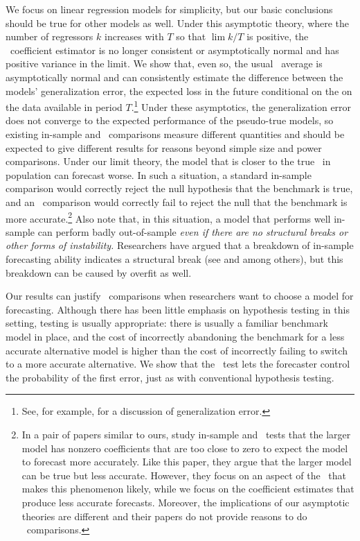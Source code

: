\documentclass[11pt]{article}
\begin{document}
We focus on linear regression models for simplicity, but our basic
conclusions should be true for other models as well.  Under this
asymptotic theory, where the number of regressors $k$ increases with $T$
so that $\lim k/T$ is positive,
the \ols\ coefficient estimator is no longer
consistent or asymptotically normal \citep{Hub:73} and has positive
variance in the limit.  We show that, even so, the usual \oos\ average
is asymptotically normal and can consistently estimate the difference
between the models' generalization error, the expected loss in the
future conditional on the on the data available in period
$T$.\footnote{See, for example, \citet{HTF:08} for a discussion of
  generalization error.}  Under these asymptotics, the generalization
error does not converge to the expected performance of the pseudo-true
models, so existing in-sample and \oos\ comparisons measure different
quantities and should be expected to give different results for
reasons beyond simple size and power comparisons.  Under our limit theory,
the model that is closer to the true \dgp\ in population can forecast
worse.  In such a situation, a standard in-sample comparison would
correctly reject the null hypothesis that the benchmark is true, and
an \oos\ comparison would correctly fail to reject the null that the
benchmark is more accurate.\footnote{In a pair of papers similar to
  ours, \citet{ClM:12,ClM:12b} study in-sample and \oos\ tests that
  the larger model has nonzero coefficients that are too close to zero
  to expect the model to forecast more accurately.  Like this paper,
  they argue that the larger model can be true but less accurate.
  However, they focus on an aspect of the \dgp\ that makes this
  phenomenon likely, while we focus on the coefficient estimates that
  produce less accurate forecasts.  Moreover, the implications of our
  asymptotic theories are different and their papers do not provide
  reasons to do \oos\ comparisons.}
Also note that, in this situation, a model that performs well
in-sample can perform badly out-of-sample \emph{even if there are no
structural breaks or other forms of instability.}  Researchers
have argued that a breakdown of in-sample forecasting ability
indicates a structural break (see \citealp{BoH:99} and
\citealp{StW:03} among others), but this breakdown can be caused by overfit as
well.

Our results can justify \oos\ comparisons when researchers want to
choose a model for forecasting.  Although there has been little
emphasis on hypothesis testing in this setting, testing is usually
appropriate: there is usually a familiar benchmark model in place, and
the cost of incorrectly abandoning the benchmark for a less accurate
alternative model is higher than the cost of incorrectly failing to
switch to a more accurate alternative.  We show that the \dmw\ test
lets the forecaster control the probability of the first error, just
as with conventional hypothesis testing.
\end{document}
